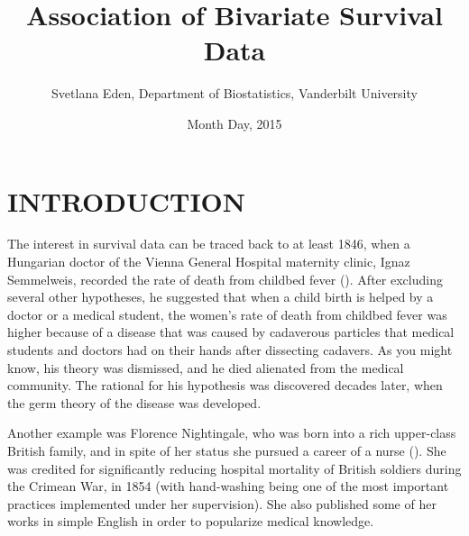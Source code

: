 \documentclass[]{article}
\title{Association of Bivariate Survival Data}
\author{Svetlana Eden, Department of Biostatistics, Vanderbilt University}
\date{Month Day, 2015}
\begin{document}
\maketitle
\tableofcontents
\listoffigures
\listoftables
\clearpage

\section{INTRODUCTION}
The interest in survival data can be traced back to at least 1846, when a Hungarian doctor of the Vienna General Hospital maternity clinic, Ignaz Semmelweis, recorded the rate of death from childbed fever (\cite{wiki:IgnazSemmelweis}). After excluding several other hypotheses, he suggested that when a child birth is helped by a doctor or a medical student, the women's rate of death from childbed fever was higher because of a disease that was caused by cadaverous particles that medical students and doctors had on their hands after dissecting cadavers. As you might know, his theory was dismissed, and he died alienated from the medical community. The rational for his hypothesis was discovered decades later, when the germ theory of the disease was developed. 


Another example was Florence Nightingale, who was born into a rich upper-class British family, and in spite of her status she pursued a career of a nurse (\cite{wiki:FlorenceNightingale}). She was credited for significantly reducing hospital mortality of British soldiers during the Crimean War, in 1854 (with hand-washing being one of the most important practices implemented under her supervision). She also published some of her works in simple English in order to popularize medical knowledge.\\
\end{document}
